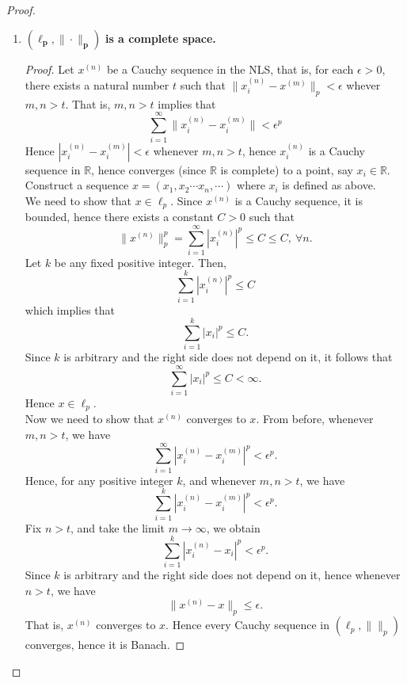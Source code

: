 \begin{eg}
\begin{proof}
\begin{enumerate}
            \item $\bm{(\ell_{p},\|\cdot\|_{p})}$\textbf{ is a complete space.}
                \begin{proof}
                    Let $x^{(n)}$ be a Cauchy sequence in the NLS, that is, for each $\epsilon>0$, there exists a natural number $t$ such that $\|x_{i}^{(n)}-x^{(m)}\|_{p}<\epsilon$ whever $m,n>t$. That is, $m,n>t$ implies that $$\sum_{i=1}^{\infty}\|x_{i}^{(n)}-x_{i}^{(m)}\|<\epsilon^{p}$$ 
                    Hence $\left|x_{i}^{(n)}-x_{i}^{(m)}\right|<\epsilon$ whenever $m,n>t$, hence $x_{i}^{(n)}$ is a Cauchy sequence in $\mathbb{R}$, hence converges (since $\mathbb{R}$ is complete) to a point, say $x_{i}\in \mathbb{R}$.\\ 
                    Construct a sequence $x=(x_{1},x_{2}\cdots x_{n},\cdots)$ where $x_{i}$ is defined as above.\\
                    We need to show that $x\in\ell_{p}$. Since $x^{(n)}$ is a Cauchy sequence, it is bounded, hence there exists a constant $C>0$ such that $$\|x^{(n)}\|_{p}^{p}=\sum_{i=1}^{\infty}\left|x_{i}^{(n)}\right|^{p}\leq C\leq C,~\forall n.$$
                    Let $k$ be any fixed positive integer. Then, $$\sum_{i=1}^{k}\left|x_{i}^{(n)}\right|^{p}\leq C$$ which implies that $$\sum_{i=1}^{k}\left|x_{i}\right|^{p}\leq C.$$
                    Since $k$ is arbitrary and the right side does not depend on it, it follows that $$\sum_{i=1}^{\infty}\left|x_{i}\right|^{p}\leq C<\infty.$$
                    Hence $x\in\ell_{p}$.\\ 
                    Now we need to show that $x^{(n)}$ converges to $x$. From before, whenever $m,n>t$, we have $$\sum_{i=1}^{\infty}|x_{i}^{(n)}-x_{i}^{(m)}|^{p}<\epsilon^{p}.$$
                    Hence, for any positive integer $k$, and whenever $m,n>t$, we have $$\sum_{i=1}^{k}|x_{i}^{(n)}-x_{i}^{(m)}|^{p}<\epsilon^{p}.$$
                    Fix $n>t$, and take the limit $m\to\infty$, we obtain $$\sum_{i=1}^{k}|x_{i}^{(n)}-x_{i}|^{p}<\epsilon^{p}.$$
                    Since $k$ is arbitrary and the right side does not depend on it, hence whenever $n>t$, we have $$\|x^{(n)}-x\|_{p}\leq \epsilon.$$
                    That is, $x^{(n)}$ converges to $x$.
                    Hence every Cauchy sequence in $(\ell_{p},\|\|_{p})$ converges, hence it is Banach.
                \end{proof}
        \end{enumerate}
        \phantom\qedhere
    \end{proof}
\end{eg}
